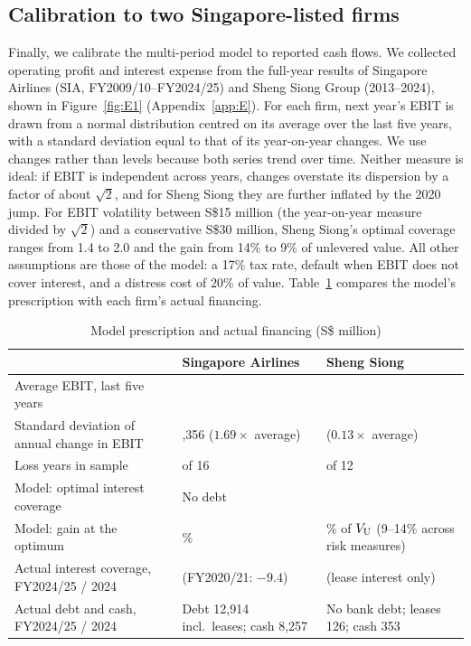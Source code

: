 \subsection{Calibration to two Singapore-listed firms}\label{sec:calib}

Finally, we calibrate the multi-period model to reported cash flows. We collected operating profit and interest expense from the full-year results of Singapore Airlines (SIA, FY2009/10--FY2024/25) and Sheng Siong Group (2013--2024), shown in Figure~\ref{fig:E1} (Appendix~\ref{app:E}). For each firm, next year's EBIT is drawn from a normal distribution centred on its average over the last five years, with a standard deviation equal to that of its year-on-year changes. We use changes rather than levels because both series trend over time. Neither measure is ideal: if EBIT is independent across years, changes overstate its dispersion by a factor of about $\sqrt{2}$, and for Sheng Siong they are further inflated by the 2020 jump. For EBIT volatility between S\$15 million (the year-on-year measure divided by $\sqrt{2}$) and a conservative S\$30 million, Sheng Siong's optimal coverage ranges from 1.4 to 2.0 and the gain from 14\% to 9\% of unlevered value. All other assumptions are those of the model: a 17\% tax rate, default when EBIT does not cover interest, and a distress cost of 20\% of value. Table~\ref{tab:firms} compares the model's prescription with each firm's actual financing.

\begin{table}[htbp]\centering\footnotesize
\caption{Model prescription and actual financing (S\$ million)}\label{tab:firms}
\setlength{\tabcolsep}{4pt}%
\begin{tabularx}{\linewidth}{@{}l>{\centering\arraybackslash\hsize=0.91\hsize}X>{\centering\arraybackslash\hsize=1.09\hsize}X@{}}
\toprule
 & Singapore Airlines & Sheng Siong \\
\midrule
Average EBIT, last five years & 801 & 161 \\
Standard deviation of annual change in EBIT & 1,356 ($1.69 \times$ average) & 22 ($0.13 \times$ average) \\
Loss years in sample & 2 of 16 & 0 of 12 \\
Model: optimal interest coverage & No debt & 1.6 \\
Model: gain at the optimum & 0\% & 11.9\% of $V_{\mathrm{U}}$ (9--14\% across risk measures) \\
Actual interest coverage, FY2024/25 / 2024 & 4.3 (FY2020/21: $-9.4$) & 36 (lease interest only) \\
Actual debt and cash, FY2024/25 / 2024 & Debt 12,914 incl.\ leases; cash 8,257 & No bank debt; leases 126; cash 353 \\
\bottomrule
\end{tabularx}
\end{table}

